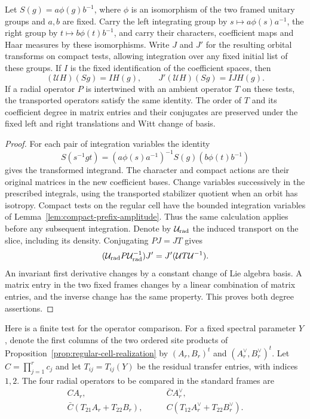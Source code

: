 \begin{auxlemma}\label{lem:compact-radial-transport}
Let \(S(g)=a\phi(g)b^{-1}\), where \(\phi\) is an isomorphism of
the two framed unitary groups and \(a,b\) are fixed. Carry the left
integrating group by \(s\mapsto a\phi(s)a^{-1}\), the right group by
\(t\mapsto b\phi(t)b^{-1}\), and carry their characters, coefficient
maps and Haar measures by these isomorphisms. Write \(J\) and
\(J'\) for the resulting orbital transforms on compact tests, allowing
integration over any fixed initial list of these groups.
If \(I\) is the fixed identification of the coefficient spaces, then
\[
 (\mathcal U H)(Sg)=I H(g),\qquad
 J'(\mathcal U H)(Sg)=I JH(g).
\]
If a radial operator \(P\) is intertwined with an ambient operator
\(T\) on these tests, the transported operators satisfy the same
identity. The order of \(T\) and its coefficient degree in matrix
entries and their conjugates are preserved under the fixed left
and right translations and Witt change of basis.
\end{auxlemma}
\begin{proof}
For each pair of integration variables the identity
\[
 S(s^{-1}gt)=(a\phi(s)a^{-1})^{-1}S(g)(b\phi(t)b^{-1})
\]
gives the transformed integrand. The character and compact actions
are their original matrices in the new coefficient bases. Change
variables successively in the prescribed integrals, using the
transported stabilizer quotient when an orbit has isotropy. Compact
tests on the regular cell have the bounded integration variables of
Lemma~\ref{lem:compact-prefix-amplitude}. Thus the same calculation
applies before any subsequent integration. Denote by
\(\mathcal U_{\rm rad}\) the induced transport on the slice,
including its density. Conjugating \(PJ=JT\) gives
\[
 (\mathcal U_{\rm rad}P\mathcal U_{\rm rad}^{-1})J'
          =J'(\mathcal U T\mathcal U^{-1}).
\]
An invariant first derivative changes by a constant change of Lie
algebra basis. A matrix entry in the two fixed frames changes by a
linear combination of matrix entries, and the inverse change has the
same property. This proves both degree assertions.
\end{proof}

Here is a finite test for the operator comparison. For a fixed spectral parameter \(Y\), denote the first columns of the two ordered site products of Proposition~\ref{prop:regular-cell-realization} by \((A_r,B_r)^t\) and \((A_r^\vee,B_r^\vee)^t\). Let \(C=\prod_{j=1}^r c_j\) and let \(T_{ij}=T_{ij}(Y)\) be the residual transfer entries, with indices \(1,2\). The four radial operators to be compared in the standard frames are
\[
\begin{aligned}
 CA_r,\qquad &\bar C A_r^\vee,\\
 \bar C(T_{21}A_r+T_{22}B_r),\qquad&
 C(T_{12}A_r^\vee+T_{22}B_r^\vee).
\end{aligned}
\]

